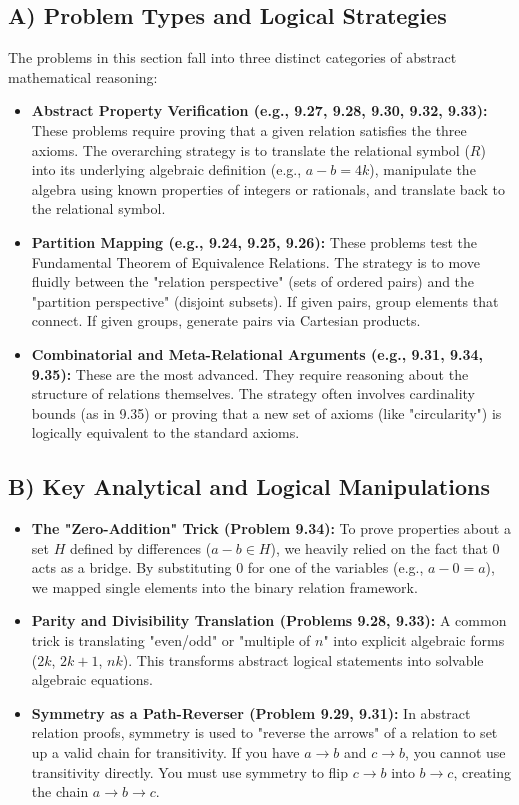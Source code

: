 \documentclass[11pt, a4paper]{article}
\theoremstyle{definition}
\theoremstyle{remark}
\begin{document}
\subsection{A) Problem Types and Logical Strategies}
The problems in this section fall into three distinct categories of abstract mathematical reasoning:
\begin{itemize}
    \item \textbf{Abstract Property Verification (e.g., 9.27, 9.28, 9.30, 9.32, 9.33):} These problems require proving that a given relation satisfies the three axioms. The overarching strategy is to translate the relational symbol ($R$) into its underlying algebraic definition (e.g., $a-b = 4k$), manipulate the algebra using known properties of integers or rationals, and translate back to the relational symbol.
    \item \textbf{Partition Mapping (e.g., 9.24, 9.25, 9.26):} These problems test the Fundamental Theorem of Equivalence Relations. The strategy is to move fluidly between the "relation perspective" (sets of ordered pairs) and the "partition perspective" (disjoint subsets). If given pairs, group elements that connect. If given groups, generate pairs via Cartesian products.
    \item \textbf{Combinatorial and Meta-Relational Arguments (e.g., 9.31, 9.34, 9.35):} These are the most advanced. They require reasoning about the structure of relations themselves. The strategy often involves cardinality bounds (as in 9.35) or proving that a new set of axioms (like "circularity") is logically equivalent to the standard axioms.
\end{itemize}

\subsection{B) Key Analytical and Logical Manipulations}
\begin{itemize}
    \item \textbf{The "Zero-Addition" Trick (Problem 9.34):} To prove properties about a set $H$ defined by differences ($a-b \in H$), we heavily relied on the fact that $0$ acts as a bridge. By substituting $0$ for one of the variables (e.g., $a - 0 = a$), we mapped single elements into the binary relation framework.
    \item \textbf{Parity and Divisibility Translation (Problems 9.28, 9.33):} A common trick is translating "even/odd" or "multiple of $n$" into explicit algebraic forms ($2k$, $2k+1$, $nk$). This transforms abstract logical statements into solvable algebraic equations.
    \item \textbf{Symmetry as a Path-Reverser (Problem 9.29, 9.31):} In abstract relation proofs, symmetry is used to "reverse the arrows" of a relation to set up a valid chain for transitivity. If you have $a \to b$ and $c \to b$, you cannot use transitivity directly. You must use symmetry to flip $c \to b$ into $b \to c$, creating the chain $a \to b \to c$.
\end{itemize}
\end{document}
